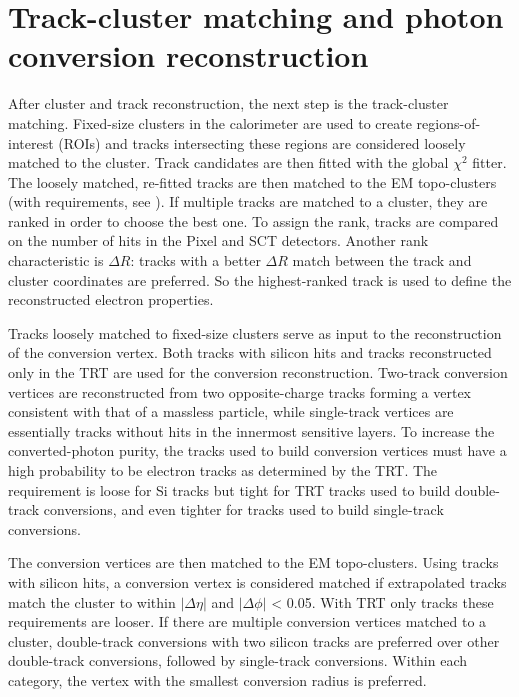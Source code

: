 \documentclass[a4paper, oneside]{book}
\begin{document}
		\section{Track-cluster matching and photon conversion reconstruction}\label{section:match}
			\cite{El ph reco} After cluster and track reconstruction, the next step is the track-cluster matching. Fixed-size clusters in the calorimeter are used to create regions-of-interest (ROIs) and tracks intersecting
			these regions are considered loosely matched to the cluster. Track candidates are then fitted with the global $\chi^2$ fitter. The loosely matched, re-fitted tracks are then matched to the EM topo-clusters (with requirements, see \cite{El ph reco}).
			If multiple tracks are matched to a cluster, they are ranked in order to choose the best one. To assign the rank, tracks are compared on the number of hits in the Pixel and SCT detectors. Another rank characteristic is $\Delta R$: tracks with a better $\Delta R$ match between the track and cluster coordinates are preferred. So the highest-ranked track is used to define the reconstructed electron properties.
			
			Tracks loosely matched to fixed-size clusters serve as input to the reconstruction of the conversion vertex. Both tracks with silicon hits and tracks reconstructed only in the TRT are used for the conversion reconstruction. Two-track conversion vertices are reconstructed from two opposite-charge tracks forming a vertex consistent with that of a massless particle, while single-track vertices are essentially tracks without hits in the innermost sensitive layers. To increase the converted-photon purity, the tracks used to build conversion vertices must have a high probability to be electron tracks as determined by the TRT. The requirement is loose for Si tracks but tight for TRT tracks used to build double-track conversions, and even tighter for tracks used to build single-track conversions. 
			
			The conversion vertices are then matched to the EM topo-clusters. Using tracks with silicon hits, a conversion vertex is considered matched if extrapolated tracks
			match the cluster to within $|\Delta \eta|$ and $|\Delta \phi|$ < 0.05. With TRT only tracks these requirements are looser.
			If there are multiple conversion vertices matched to a cluster, double-track conversions with two silicon tracks are preferred over other double-track conversions, followed by single-track conversions. Within each category, the vertex with the smallest
			conversion radius is preferred.
			
\end{document}
